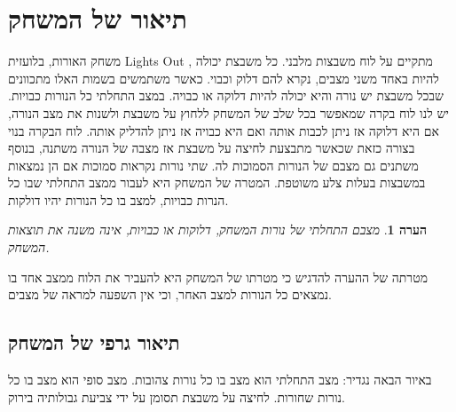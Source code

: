 \documentclass[12pt,leqno]{article}
\theoremstyle{theoremdd}
\newtheorem{comm}{הערה}[section]
\begin{document}
\section{תיאור של המשחק}
משחק האורות,  בלועזית
\textenglish{Lights Out}
,
מתקיים על לוח משבצות מלבני.
כל משבצת יכולה להיות באחד משני מצבים, נקרא להם דלוק וכבוי.
כאשר משתמשים בשמות האלו מתכוונים שבכל משבצת יש נורה והיא יכולה להיות דלוקה או כבויה. במצב התחלתי כל הנורות כבויות.
יש לנו לוח בקרה שמאפשר בכל שלב של המשחק ללחוץ על משבצת ולשנות את מצב הנורה, אם היא דלוקה אז ניתן לכבות אותה ואם היא כבויה אז ניתן להדליק אותה.
לוח הבקרה בנוי בצורה כזאת שכאשר מתבצעת לחיצה על משבצת אז מצבה של הנורה משתנה, בנוסף משתנים גם מצבם של הנורות הסמוכות לה.
שתי נורות נקראות סמוכות אם הן נמצאות במשבצות בעלות צלע משוטפת.
המטרה של המשחק היא לעבור ממצב התחלתי שבו כל הנרות כבויות, למצב בו כל הנורות יהיו דולקות. 
\begin{comm}
מצבם התחלתי של נורות המשחק, דלוקות או כבויות, אינה משנה את תוצאות המשחק.
\end{comm}
מטרתה של ההערה להדגיש כי
מטרתו של המשחק היא להעביר
 את הלוח ממצב אחד בו נמצאים כל הנורות למצב האחר,
 וכי אין השפעה למראה של מצבים.
 
\subsection{תיאור גרפי של המשחק}
באיור הבאה נגדיר:
מצב התחלתי הוא מצב בו כל נורות
צהובות.
מצב סופי הוא מצב בו כל נורות שחורות.
לחיצה על משבצת תסומן על ידי צביעת גבולותיה בירוק.
\end{document}
